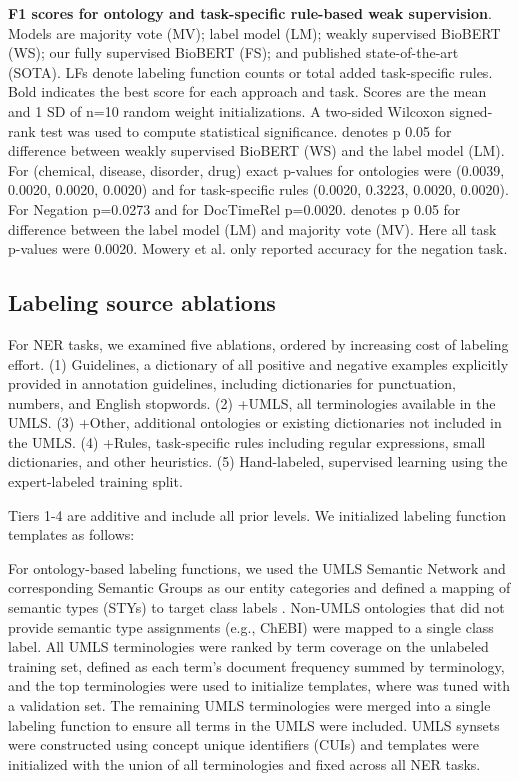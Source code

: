 \documentclass{article}
\begin{document}
\begin{table}[H]
\caption{\label{tbl:results} \textbf{F1 scores for ontology and task-specific rule-based weak supervision}.  Models are majority vote (MV); label model (LM); weakly supervised BioBERT (WS); our fully supervised BioBERT (FS); and published state-of-the-art (SOTA). LFs denote labeling function counts or total added task-specific rules. Bold indicates the best score for each approach and task. Scores are the mean and 1 SD of {n=10} random weight initializations. {A two-sided} Wilcoxon signed-rank test was used to compute statistical significance. 
 denotes p  {0.05} for difference between weakly supervised BioBERT (WS) and the label model (LM). {For (chemical, disease, disorder, drug) exact p-values for ontologies were (0.0039, 0.0020, 0.0020, 0.0020) and for task-specific rules (0.0020, 0.3223, 0.0020, 0.0020). For Negation p=0.0273 and for DocTimeRel p=0.0020.}
 denotes p  {0.05} for difference between the label model (LM) and majority vote (MV). {Here all task p-values were 0.0020.}  
 Mowery et al. \cite{Mowery2014-yx} only reported accuracy for the negation task. 
}
\end{table}



\subsection*{Labeling source ablations}

For NER tasks, we examined five ablations, ordered by increasing cost of labeling effort. 
{
(1) Guidelines, a dictionary of all positive and negative examples explicitly provided in annotation guidelines, including dictionaries for punctuation, numbers, and English stopwords. 
(2) +UMLS, all terminologies available in the UMLS. 
(3) +Other, additional ontologies or existing dictionaries not included in the UMLS.
(4) +Rules, task-specific rules including regular expressions, small dictionaries, and other heuristics.
(5) Hand-labeled, supervised learning using the expert-labeled training split. 
}




Tiers 1-4 are additive and include all prior levels. We initialized labeling function templates as follows: 

{For ontology-based labeling functions,} we used the UMLS Semantic Network and corresponding Semantic Groups as our entity categories and defined a mapping of semantic types (STYs) to target class labels . Non-UMLS ontologies that did not provide semantic type assignments (e.g., ChEBI) were mapped to a single class label. 
All UMLS terminologies  were ranked by term coverage on the unlabeled training set, defined as each term's document frequency summed by terminology, and the top  terminologies were used to initialize templates, where  was tuned with a validation set. 
The remaining  UMLS terminologies were merged into a single labeling function to ensure all terms in the UMLS were included. 
UMLS synsets were constructed using concept unique identifiers (CUIs) and templates were initialized with the union of all terminologies and fixed across all NER tasks.
\end{document}
